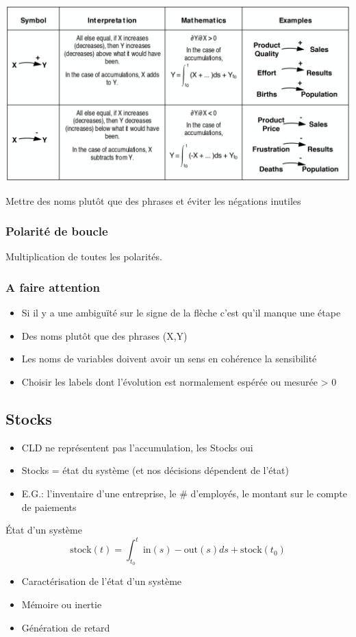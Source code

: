\documentclass[resume]{subfiles}
\begin{document}
\begin{center}
\includegraphics[width=\columnwidth]{Figures/CLD_2.PNG}
\end{center}
Mettre des noms plutôt que des phrases et éviter les négations inutiles
\subsubsection{Polarité de boucle}
Multiplication de toutes les polarités.
\subsubsection{A faire attention}
\begin{itemize}
\item Si il y a une ambiguïté sur le signe de la flèche c'est qu'il manque une étape
\item Des noms plutôt que des phrases (X,Y)
\item Les noms de variables doivent avoir un sens en
  cohérence la sensibilité
\item Choisir les labels dont l'évolution est normalement
  espérée ou mesurée > 0
\end{itemize}
\subsection{Stocks}
\begin{itemize}
\item CLD ne représentent pas l'accumulation, les Stocks oui
\item Stocks = état du système (et nos décisions dépendent de
  l'état)
\item E.G.: l'inventaire d'une entreprise, le \# d'employés, le
  montant sur le compte de paiements  
\end{itemize}
État d'un système
$$\text{stock}(t)=\int_{t_0}^{t}\text{in}(s)-\text{out}(s)ds+\text{stock}(t_0)$$
\begin{itemize}
\item Caractérisation de l'état d'un système
\item Mémoire ou inertie
\item Génération de retard
\end{itemize}
\end{document}

